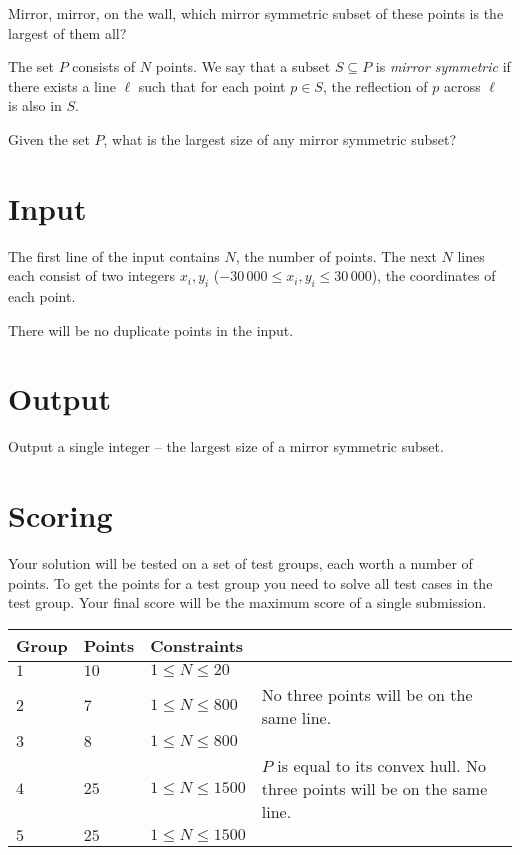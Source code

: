 Mirror, mirror, on the wall, which mirror symmetric subset of these points is the largest of them all?

The set $P$ consists of $N$ points.
We say that a subset $S \subseteq P$ is \emph{mirror symmetric} if there exists a line $\ell$ such that for each point $p \in S$, the reflection of $p$ across $\ell$ is also in $S$.

Given the set $P$, what is the largest size of any mirror symmetric subset?

\section*{Input}
The first line of the input contains $N$, the number of points.
The next $N$ lines each consist of two integers $x_i, y_i$ ($-30\,000 \le x_i, y_i \le 30\,000$), the coordinates of each point.

There will be no duplicate points in the input.

\section*{Output}
Output a single integer -- the largest size of a mirror symmetric subset.

\section*{Scoring}
Your solution will be tested on a set of test groups, each worth a number of points.
To get the points for a test group you need to solve all test cases in the test group.
Your final score will be the maximum score of a single submission.

\noindent
\begin{tabular}{| l | l | l | p{7cm} |}
\hline
Group & Points & Constraints \\ \hline
$1$   & $10$   & $1 \leq N \leq 20$ & \\ \hline
$2$   & $7$    & $1 \leq N \leq 800$ & No three points will be on the same line.\\ \hline
$3$   & $8$    & $1 \leq N \leq 800$ & \\ \hline
$4$   & $25$   & $1 \leq N \leq 1500$ & $P$ is equal to its convex hull. No three points will be on the same line.\\ \hline
$5$   & $25$   & $1 \leq N \leq 1500$ & \\ \hline
\end{tabular}
